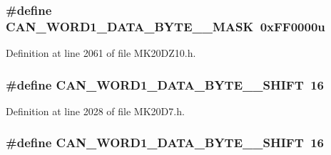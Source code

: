 \subsubsection[{\texorpdfstring{C\+A\+N\+\_\+\+W\+O\+R\+D1\+\_\+\+D\+A\+T\+A\+\_\+\+B\+Y\+T\+E\+\_\+5\+\_\+\+M\+A\+SK}{CAN_WORD1_DATA_BYTE_5_MASK}}]{\setlength{\rightskip}{0pt plus 5cm}\#define C\+A\+N\+\_\+\+W\+O\+R\+D1\+\_\+\+D\+A\+T\+A\+\_\+\+B\+Y\+T\+E\+\_\+\_\+\+M\+A\+SK~0x\+F\+F0000u}\hypertarget{group___c_a_n___register___masks_ga9762ba9b3f8288f68e3db1e0d2deccaf}{}\label{group___c_a_n___register___masks_ga9762ba9b3f8288f68e3db1e0d2deccaf}


Definition at line 2061 of file M\+K20\+D\+Z10.\+h.

\subsubsection[{\texorpdfstring{C\+A\+N\+\_\+\+W\+O\+R\+D1\+\_\+\+D\+A\+T\+A\+\_\+\+B\+Y\+T\+E\+\_\+5\+\_\+\+S\+H\+I\+FT}{CAN_WORD1_DATA_BYTE_5_SHIFT}}]{\setlength{\rightskip}{0pt plus 5cm}\#define C\+A\+N\+\_\+\+W\+O\+R\+D1\+\_\+\+D\+A\+T\+A\+\_\+\+B\+Y\+T\+E\+\_\+\_\+\+S\+H\+I\+FT~16}\hypertarget{group___c_a_n___register___masks_ga74e324a0ea45adbeeafd694ddebc4e02}{}\label{group___c_a_n___register___masks_ga74e324a0ea45adbeeafd694ddebc4e02}


Definition at line 2028 of file M\+K20\+D7.\+h.

\subsubsection[{\texorpdfstring{C\+A\+N\+\_\+\+W\+O\+R\+D1\+\_\+\+D\+A\+T\+A\+\_\+\+B\+Y\+T\+E\+\_\+5\+\_\+\+S\+H\+I\+FT}{CAN_WORD1_DATA_BYTE_5_SHIFT}}]{\setlength{\rightskip}{0pt plus 5cm}\#define C\+A\+N\+\_\+\+W\+O\+R\+D1\+\_\+\+D\+A\+T\+A\+\_\+\+B\+Y\+T\+E\+\_\+\_\+\+S\+H\+I\+FT~16}\hypertarget{group___c_a_n___register___masks_ga74e324a0ea45adbeeafd694ddebc4e02}{}\label{group___c_a_n___register___masks_ga74e324a0ea45adbeeafd694ddebc4e02}


